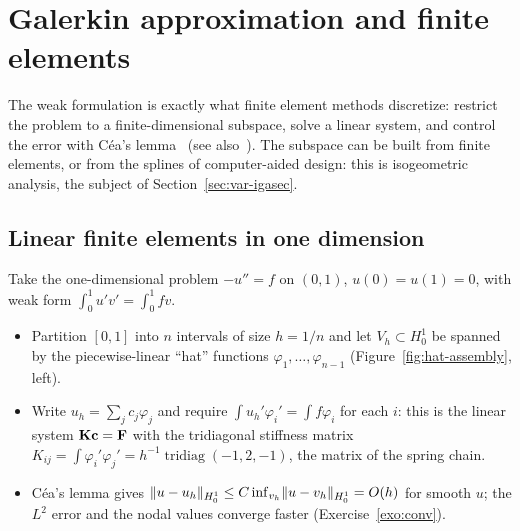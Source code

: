 \section{Galerkin approximation and finite elements}\label{sec:var-fem}
%
The weak formulation is exactly what finite element methods discretize:
restrict the problem to a finite-dimensional subspace, solve a linear system,
and control the error with C\'ea's lemma~\cite{Cea1964}
(see also~\cite{Ciarlet2002,BrennerScott2008}). The subspace can be built
from finite elements, or from the splines of computer-aided design: this is
isogeometric analysis, the subject of Section~\ref{sec:var-igasec}.
\begin{center}
\end{center}

\subsection{Linear finite elements in one dimension}\label{sec:var-fem-1d}
%
Take the one-dimensional problem $-u''=f$ on $(0,1)$, $u(0)=u(1)=0$, with weak
form $\displaystyle \int_0^1u'v'=\int_0^1fv$.
\begin{itemize}
  \item Partition $[0,1]$ into $n$ intervals of size $h=1/n$ and let
  $V_h\subset H^1_0$ be spanned by the piecewise-linear ``hat'' functions
  $\varphi_1,\dots,\varphi_{n-1}$ (Figure~\ref{fig:hat-assembly}, left).
  \item Write $u_h=\sum_jc_j\varphi_j$ and require
  $\displaystyle \int u_h'\varphi_i'=\int f\varphi_i$ for each $i$: this is the linear
  system $\mathbf{K}\mathbf{c}=\mathbf{F}$ with the tridiagonal stiffness matrix
  $\displaystyle K_{ij}=\int\varphi_i'\varphi_j'=h^{-1}\operatorname{tridiag}(-1,2,-1)$,
  the matrix of the spring chain.
  \item C\'ea's lemma gives $\lVert u-u_h\rVert_{H^1_0}\le C\inf_{v_h}\lVert u-v_h\rVert_{H^1_0}=O(h)$
  for smooth $u$; the $L^2$ error and the nodal values converge faster
  (Exercise~\ref{exo:conv}).
\end{itemize}

